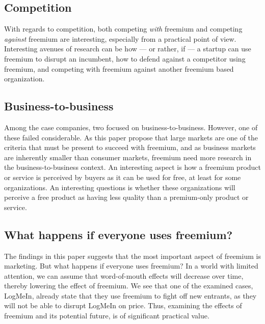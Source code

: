 \subsection{Competition}

With regards to competition, both competing \emph{with} freemium and competing \emph{against} freemium are interesting, especially from a practical point of view. Interesting avenues of research can \eg be how --- or rather, if --- a startup can use freemium to disrupt an incumbent, how to defend against a competitor using freemium, and competing with freemium against another freemium based organization.

\subsection{Business-to-business}

Among the case companies, two focused on business-to-business. However, one of these failed considerable. As this paper propose that large markets are one of the criteria that must be present to succeed with freemium, and as business markets are inherently smaller than consumer markets, freemium need more research in the business-to-business context. An interesting aspect is how a freemium product or service is perceived by buyers as it can be used for free, at least for some organizations. An interesting questions is whether these organizations will perceive a free product as having less quality than a premium-only product or service.

\subsection{What happens if everyone uses freemium?}

The findings in this paper suggests that the most important aspect of freemium is marketing. But what happens if everyone uses freemium? In a world with limited attention, we can assume that word-of-mouth effects will decrease over time, thereby lowering the effect of freemium. We see that one of the examined cases, LogMeIn, already state that they use freemium to fight off new entrants, as they will not be able to disrupt LogMeIn on price. Thus, examining the effects of freemium and its potential future, is of significant practical value.

% 
% 
% 

